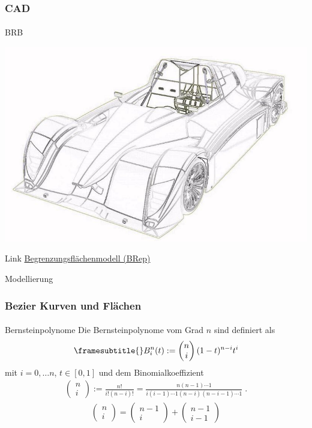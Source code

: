 \documentclass{beamer}
\begin{document}
\begin{frame}
    \frametitle{CAD}
\framesubtitle{}
    \begin{block}{BRB}
\begin{center}
\includegraphics[scale=0.85]{images/brb}
\end{center}
\end{block}

\begin{block}{Link}
\href{https://de.wikipedia.org/wiki/Boundary_Representation}{Begrenzungsflächenmodell (BRep)}
\end{block}

\end{frame}






\begin{frame}{Modellierung}
\frametitle{Bezier Kurven und Flächen}
\framesubtitle{}
 \begin{block}{Bernsteinpolynome}
Die Bernsteinpolynome vom Grad $n$ sind definiert als
\begin{align*}
\framesubtitle{}
B_i^n(t) := \begin{pmatrix} n \\ i \end{pmatrix} (1-t)^{n-i}t^i
\end{align*}
mit $i = 0, \hdots n$, $t \in [0,1]$ und dem Binomialkoeffizient
\begin{align*}
\begin{pmatrix} n \\ i \end{pmatrix} := \frac{n!}{i!(n-i)!} = \frac{n(n-1) \cdots 1}{i(i-1) \cdots 1 (n-i) (n-i-1) \cdots 1 } \; .
\end{align*}
\begin{align*}
\begin{pmatrix} n \\ i \end{pmatrix} = \begin{pmatrix} n-1 \\ i \end{pmatrix} + \begin{pmatrix} n-1 \\ i-1 \end{pmatrix} 
\end{align*}
\end{block}

\end{frame}
\end{document}
